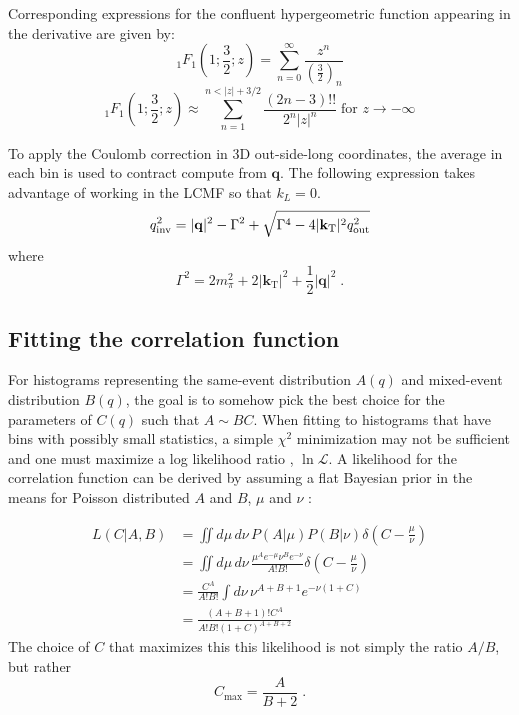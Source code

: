 Corresponding expressions for the confluent hypergeometric function appearing in the derivative are given by:
\begin{equation}
 {}_1F_1 \left( 1;\frac{3}{2}; z \right) = \sum_{n=0}^{\infty} \frac{z^n}{\left(\frac{3}{2}\right)_n} 
\end{equation}
\begin{equation}
  {}_1F_1 \left( 1; \frac{3}{2}; z \right) \approx \sum_{n=1}^{n < |z| + 3/2} \frac{(2n-3)!!}{2^n |z|^n} \; \textrm{for } z \rightarrow -\infty
\end{equation}

To apply the Coulomb correction in 3D out-side-long coordinates, the average \kt in each bin is used to contract compute \qinv from $\mathbf{q}$.
The following expression takes advantage of working in the \ac{LCMF} so that $k_L = 0$.
\begin{equation}
q_{\mathrm{inv}}^2 = |\mathbf{q}|^2 - \Gamma^2 + \sqrt{\Gamma^4 - 4 |\mathbf{k}_\mathrm{T}|^2 q_{\mathrm{out}}^2} \label{eq:q3_to_qinv}
\end{equation}
where
\begin{equation}
\Gamma^2 = 2 m_{\pi}^2 + 2 |\mathbf{k}_\mathrm{T}|^2 + \frac{1}{2}|\mathbf{q}|^2 \; .
\end{equation}



\subsection{Fitting the correlation function}

For histograms representing the same-event distribution $A(q)$ and mixed-event distribution $B(q)$, the goal is to somehow pick the best choice for the parameters of $C(q)$ such that $A \sim B C$.
When fitting to histograms that have bins with possibly small statistics, a simple $\chi^2$ minimization may not be sufficient and one must maximize a log likelihood ratio \cite{Baker:1983tu}, $\ln\mathcal{L}$.
A likelihood for the correlation function can be derived by assuming a flat Bayesian prior in the means for Poisson distributed $A$ and $B$, $\mu$ and $\nu$ \cite{Soltz:1994PhDT}:

\begin{align}
L(C|A,B) &= \iint d\mu \, d\nu \, P(A|\mu) P(B|\nu) \delta\left(C - \frac{\mu}{\nu} \right)\\
&= \iint d\mu \, d\nu \, \frac{\mu^{A} e^{-\mu} \nu^{B} e^{-\nu}}{A! B!} \delta\left(C - \frac{\mu}{\nu} \right)\\
&= \frac{C^A}{A! B!} \int d\nu \, \nu^{A+B+1} e^{-\nu (1+C)}\\
&= \frac{(A+B+1)! C^A}{A! B! (1+C)^{A+B+2}}
\end{align}
The choice of $C$ that maximizes this this likelihood is not simply the ratio $A/B$, but rather
\begin{equation} C_{\textrm{max}} = \frac{A}{B+2} \; .\end{equation}

